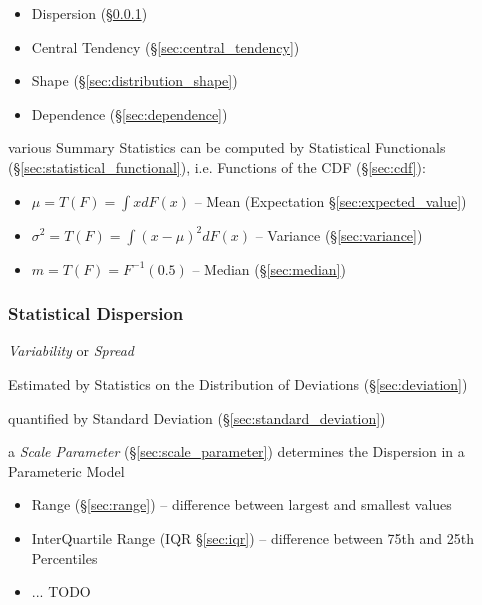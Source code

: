
\begin{itemize}
  \item Dispersion (\S\ref{sec:dispersion})
  \item Central Tendency (\S\ref{sec:central_tendency})
  \item Shape (\S\ref{sec:distribution_shape})
  \item Dependence (\S\ref{sec:dependence})
\end{itemize}

various Summary Statistics can be computed by Statistical Functionals
(\S\ref{sec:statistical_functional}), i.e. Functions of the CDF
(\S\ref{sec:cdf}):
\begin{itemize}
  \item $\mu = T(F) = \int x dF(x)$
    -- Mean (Expectation \S\ref{sec:expected_value})
  \item $\sigma^2 = T(F) = \int (x - \mu)^2 dF(x)$
    -- Variance (\S\ref{sec:variance})
  \item $m = T(F) = F^{-1}(0.5)$
    -- Median (\S\ref{sec:median})
\end{itemize}



\subsubsection{Statistical Dispersion}\label{sec:dispersion}

\emph{Variability} or \emph{Spread}

Estimated by Statistics on the Distribution of Deviations
(\S\ref{sec:deviation})

quantified by Standard Deviation (\S\ref{sec:standard_deviation})

\fist a \emph{Scale Parameter} (\S\ref{sec:scale_parameter}) determines the
Dispersion in a Parameteric Model

\begin{itemize}
  \item Range (\S\ref{sec:range}) -- difference between largest and smallest
    values
  \item InterQuartile Range (IQR \S\ref{sec:iqr}) -- difference between 75th and
    25th Percentiles
  \item ... TODO
\end{itemize}

